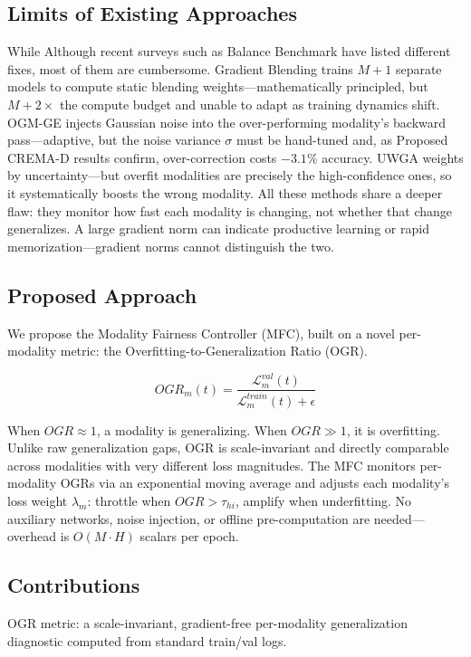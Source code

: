 \documentclass{ieeeaccess}
\begin{document}
\subsection*{Limits of Existing Approaches}
While Although recent surveys such as Balance Benchmark \cite{xu2025balancebenchmark} have listed different fixes, most of them are cumbersome. Gradient Blending \cite{wang2020makes} trains $M{+}1$ separate models to compute static blending weights---mathematically principled, but $M{+}2\times$ the compute budget and unable to adapt as training dynamics shift. OGM-GE \cite{peng2022balanced} injects Gaussian noise into the over-performing modality's backward pass---adaptive, but the noise variance $\sigma$ must be hand-tuned and, as Proposed CREMA-D results confirm, over-correction costs $-3.1\%$ accuracy. UWGA \cite{kendall2018multi} weights by uncertainty---but overfit modalities are precisely the high-confidence ones, so it systematically boosts the wrong modality. All these methods share a deeper flaw: they monitor how fast each modality is changing, not whether that change generalizes. A large gradient norm can indicate productive learning or rapid memorization---gradient norms cannot distinguish the two.

\subsection*{Proposed Approach}
We propose the Modality Fairness Controller (MFC), built on a novel per-modality metric: the Overfitting-to-Generalization Ratio (OGR).

\begin{equation}
    OGR_m(t) = \frac{\mathcal{L}^{val}_m(t)}{\mathcal{L}^{train}_m(t) + \epsilon}
\end{equation}

When $OGR \approx 1$, a modality is generalizing. When $OGR \gg 1$, it is overfitting. Unlike raw generalization gaps, OGR is scale-invariant and directly comparable across modalities with very different loss magnitudes. The MFC monitors per-modality OGRs via an exponential moving average and adjusts each modality's loss weight $\lambda_m$: throttle when $OGR > \tau_{hi}$, amplify when underfitting. No auxiliary networks, noise injection, or offline pre-computation are needed---overhead is $O(M \cdot H)$ scalars per epoch.

\subsection*{Contributions}
OGR metric: a scale-invariant, gradient-free per-modality generalization diagnostic computed from standard train/val logs.
\end{document}

